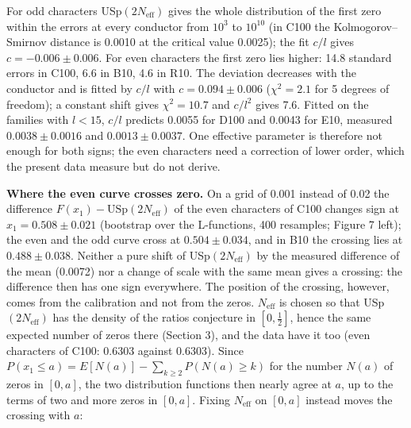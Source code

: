 \documentclass[
  10pt,
]{article}
\begin{document}
For odd characters USp\((2N_{\mathrm{eff}})\) gives the whole
distribution of the first zero within the errors at every conductor from
\(10^3\) to \(10^{10}\) (in C100 the Kolmogorov--Smirnov distance is
0.0010 at the critical value 0.0025); the fit \(c/l\) gives
\(c = -0.006 \pm 0.006\). For even characters the first zero lies
higher: 14.8 standard errors in C100, 6.6 in B10, 4.6 in R10. The
deviation decreases with the conductor and is fitted by \(c/l\) with
\(c = 0.094 \pm 0.006\) (\(\chi^2 = 2.1\) for 5 degrees of freedom); a
constant shift gives \(\chi^2 = 10.7\) and \(c/l^2\) gives 7.6. Fitted
on the families with \(l < 15\), \(c/l\) predicts 0.0055 for D100 and
0.0043 for E10, measured \(0.0038 \pm 0.0016\) and
\(0.0013 \pm 0.0037\). One effective parameter is therefore not enough
for both signs; the even characters need a correction of lower order,
which the present data measure but do not derive.

\textbf{Where the even curve crosses zero.} On a grid of 0.001 instead
of 0.02 the difference \(F(x_1) - \mathrm{USp}(2N_{\mathrm{eff}})\) of
the even characters of C100 changes sign at \(x_1 = 0.508 \pm 0.021\)
(bootstrap over the L-functions, 400 resamples; Figure 7 left); the even
and the odd curve cross at \(0.504 \pm 0.034\), and in B10 the crossing
lies at \(0.488 \pm 0.038\). Neither a pure shift of
USp\((2N_{\mathrm{eff}})\) by the measured difference of the mean
(0.0072) nor a change of scale with the same mean gives a crossing: the
difference then has one sign everywhere. The position of the crossing,
however, comes from the calibration and not from the zeros.
\(N_{\mathrm{eff}}\) is chosen so that USp\((2N_{\mathrm{eff}})\) has
the density of the ratios conjecture in \([0, \frac12]\), hence the same
expected number of zeros there (Section 3), and the data have it too
(even characters of C100: 0.6303 against 0.6303). Since
\(P(x_1 \le a) = E[N(a)] - \sum_{k \ge 2} P(N(a) \ge k)\) for the number
\(N(a)\) of zeros in \([0, a]\), the two distribution functions then
nearly agree at \(a\), up to the terms of two and more zeros in
\([0, a]\). Fixing \(N_{\mathrm{eff}}\) on \([0, a]\) instead moves the
crossing with \(a\):
\end{document}
